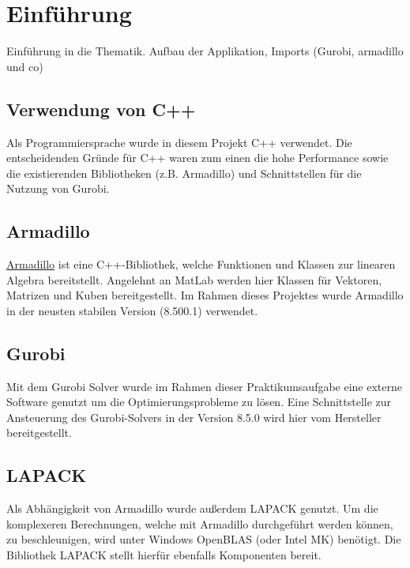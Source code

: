 \section{Einführung}
Einführung in die Thematik. Aufbau der Applikation, Imports (Gurobi, armadillo und co)
\subsection{Verwendung von C++}
Als Programmiersprache wurde in diesem Projekt C++ verwendet. Die entscheidenden Gründe für C++ waren zum einen die hohe Performance sowie die existierenden Bibliotheken (z.B. Armadillo) und Schnittstellen für die Nutzung von Gurobi.  
\subsection{Armadillo}
\href{http://arma.sourceforge.net/}{Armadillo} ist eine C++-Bibliothek, welche Funktionen und Klassen zur linearen Algebra bereitstellt. Angelehnt an MatLab werden hier Klassen für Vektoren, Matrizen und Kuben bereitgestellt.
Im Rahmen dieses Projektes wurde Armadillo in der neusten stabilen Version (8.500.1) verwendet. \\
\subsection{Gurobi}
Mit dem Gurobi Solver wurde im Rahmen dieser Praktikumsaufgabe eine externe Software genutzt um die Optimierungsprobleme zu lösen. Eine Schnittstelle zur Ansteuerung des Gurobi-Solvers in der Version 8.5.0 wird hier vom Hersteller bereitgestellt. 
\subsection{LAPACK}
Als Abhängigkeit von Armadillo wurde außerdem LAPACK genutzt. Um die komplexeren Berechnungen, welche mit Armadillo durchgeführt werden können, zu beschleunigen, wird unter Windows OpenBLAS (oder Intel MK) benötigt. Die Bibliothek LAPACK stellt hierfür ebenfalls Komponenten bereit.